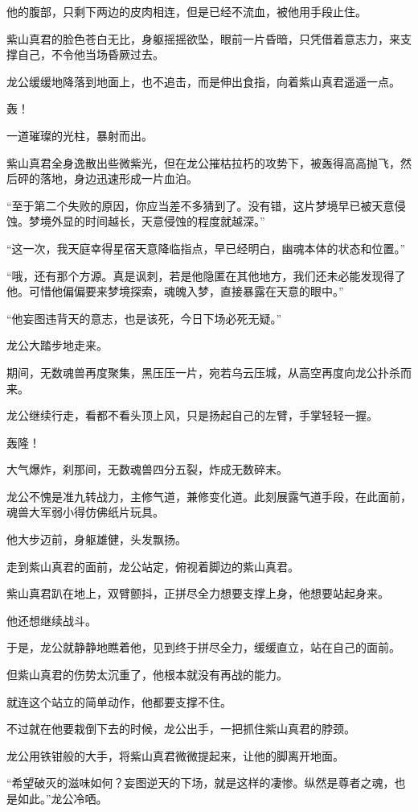 \begin{this_body}
他的腹部，只剩下两边的皮肉相连，但是已经不流血，被他用手段止住。

紫山真君的脸色苍白无比，身躯摇摇欲坠，眼前一片昏暗，只凭借着意志力，来支撑自己，不令他当场昏厥过去。

龙公缓缓地降落到地面上，也不追击，而是伸出食指，向着紫山真君遥遥一点。

轰！

一道璀璨的光柱，暴射而出。

紫山真君全身逸散出些微紫光，但在龙公摧枯拉朽的攻势下，被轰得高高抛飞，然后砰的落地，身边迅速形成一片血泊。

“至于第二个失败的原因，你应当差不多猜到了。没有错，这片梦境早已被天意侵蚀。梦境外显的时间越长，天意侵蚀的程度就越深。”

“这一次，我天庭幸得星宿天意降临指点，早已经明白，幽魂本体的状态和位置。”

“哦，还有那个方源。真是讽刺，若是他隐匿在其他地方，我们还未必能发现得了他。可惜他偏偏要来梦境探索，魂魄入梦，直接暴露在天意的眼中。”

“他妄图违背天的意志，也是该死，今日下场必死无疑。”

龙公大踏步地走来。

期间，无数魂兽再度聚集，黑压压一片，宛若乌云压城，从高空再度向龙公扑杀而来。

龙公继续行走，看都不看头顶上风，只是扬起自己的左臂，手掌轻轻一握。

轰隆！

大气爆炸，刹那间，无数魂兽四分五裂，炸成无数碎末。

龙公不愧是准九转战力，主修气道，兼修变化道。此刻展露气道手段，在此面前，魂兽大军弱小得仿佛纸片玩具。

他大步迈前，身躯雄健，头发飘扬。

走到紫山真君的面前，龙公站定，俯视着脚边的紫山真君。

紫山真君趴在地上，双臂颤抖，正拼尽全力想要支撑上身，他想要站起身来。

他还想继续战斗。

于是，龙公就静静地瞧着他，见到终于拼尽全力，缓缓直立，站在自己的面前。

但紫山真君的伤势太沉重了，他根本就没有再战的能力。

就连这个站立的简单动作，他都要支撑不住。

不过就在他要栽倒下去的时候，龙公出手，一把抓住紫山真君的脖颈。

龙公用铁钳般的大手，将紫山真君微微提起来，让他的脚离开地面。

“希望破灭的滋味如何？妄图逆天的下场，就是这样的凄惨。纵然是尊者之魂，也是如此。”龙公冷哂。


\end{this_body}
